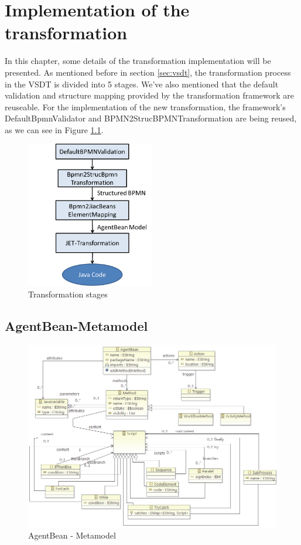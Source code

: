 \chapter{Implementation of the transformation}
\label{chap:implementation}
In this chapter, some details of the transformation implementation will be presented. As mentioned before in section \ref{sec:vsdt}, the transformation process in the VSDT is divided into 5 stages. We've also mentioned that the default validation and structure mapping provided by the transformation framework are reuseable. For the implementation of the new transformation, the framework's DefaultBpmnValidator and BPMN2StrucBPMNTransformation are being reused, as we can see in Figure \ref{fig:implementation_stages}.

\begin{figure}[h]
	\centering		\includegraphics[width=0.5\textwidth]{images/implementation_stages.png}
	\caption{Transformation stages}
	\label{fig:implementation_stages}
\end{figure}

\section{AgentBean-Metamodel}
\begin{figure}[h]
	\centering		\includegraphics[width=1.0\textwidth]{images/agentBean_metamodel.png}
	\caption{AgentBean - Metamodel}
	\label{fig:agentbean_metamodel}
\end{figure}
